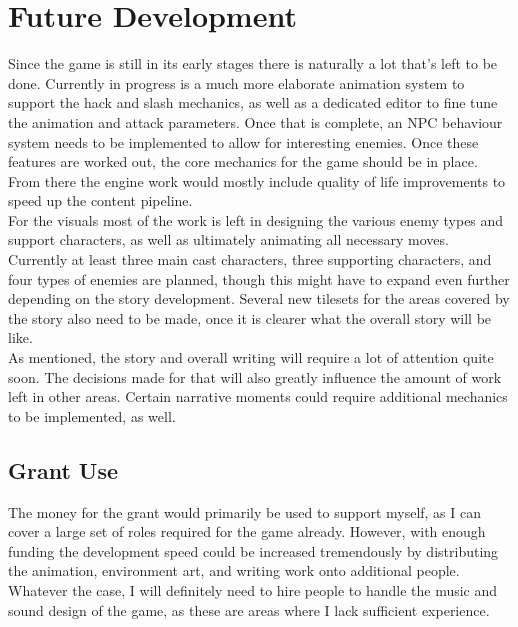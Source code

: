 \section{Future Development}
Since the game is still in its early stages there is naturally a lot that's left to be done. Currently in progress is a much more elaborate animation system to support the hack and slash mechanics, as well as a dedicated editor to fine tune the animation and attack parameters. Once that is complete, an NPC behaviour system needs to be implemented to allow for interesting enemies. Once these features are worked out, the core mechanics for the game should be in place. From there the engine work would mostly include quality of life improvements to speed up the content pipeline. \\

For the visuals most of the work is left in designing the various enemy types and support characters, as well as ultimately animating all necessary moves. Currently at least three main cast characters, three supporting characters, and four types of enemies are planned, though this might have to expand even further depending on the story development. Several new tilesets for the areas covered by the story also need to be made, once it is clearer what the overall story will be like. \\

As mentioned, the story and overall writing will require a lot of attention quite soon. The decisions made for that will also greatly influence the amount of work left in other areas. Certain narrative moments could require additional mechanics to be implemented, as well.

\subsection{Grant Use}
The money for the grant would primarily be used to support myself, as I can cover a large set of roles required for the game already. However, with enough funding the development speed could be increased tremendously by distributing the animation, environment art, and writing work onto additional people. Whatever the case, I will definitely need to hire people to handle the music and sound design of the game, as these are areas where I lack sufficient experience.

